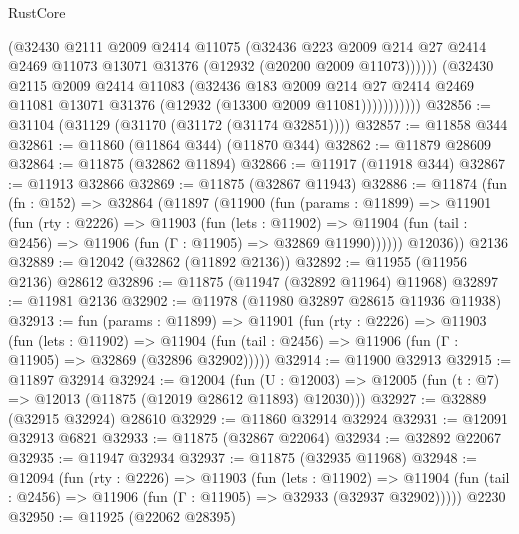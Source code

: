 \begin{lexlean}{RustCore}
\begin{coremodule}
                      (@32430
                        @2111
                        @2009
                        @2414
                        @11075
                        (@32436
                          @223
                          @2009
                          @214
                          @27
                          @2414
                          @2469
                          @11073
                          @13071
                          @31376
                          (@12932 (@20200 @2009 @11073))))))
                  (@32430
                    @2115
                    @2009
                    @2414
                    @11083
                    (@32436
                      @183
                      @2009
                      @214
                      @27
                      @2414
                      @2469
                      @11081
                      @13071
                      @31376
                      (@12932 (@13300 @2009 @11081)))))))))))
@32856 := @31104 (@31129 (@31170 (@31172 (@31174 @32851))))
@32857 := @11858 @344
@32861 := @11860 (@11864 @344) (@11870 @344)
@32862 := @11879 @28609
@32864 := @11875 (@32862 @11894)
@32866 := @11917 (@11918 @344)
@32867 := @11913 @32866
@32869 := @11875 (@32867 @11943)
@32886 := @11874
    (fun (fn : @152) =>
    @32864
      (@11897
        (@11900
          (fun (params : @11899) =>
          @11901
            (fun (rty : @2226) =>
            @11903
              (fun (lets : @11902) =>
              @11904 (fun (tail : @2456) => @11906 (fun (Γ : @11905) => @32869 @11990))))))
        @12036))
    @2136
@32889 := @12042 (@32862 (@11892 @2136))
@32892 := @11955 (@11956 @2136) @28612
@32896 := @11875 (@11947 (@32892 @11964) @11968)
@32897 := @11981 @2136
@32902 := @11978 (@11980 @32897 @28615 @11936 @11938)
@32913 := fun (params : @11899) =>
  @11901
    (fun (rty : @2226) =>
    @11903
      (fun (lets : @11902) =>
      @11904 (fun (tail : @2456) => @11906 (fun (Γ : @11905) => @32869 (@32896 @32902)))))
@32914 := @11900 @32913
@32915 := @11897 @32914
@32924 := @12004
    (fun (U : @12003) => @12005 (fun (t : @7) => @12013 (@11875 (@12019 @28612 @11893) @12030)))
@32927 := @32889 (@32915 @32924) @28610
@32929 := @11860 @32914 @32924
@32931 := @12091 @32913 @6821
@32933 := @11875 (@32867 @22064)
@32934 := @32892 @22067
@32935 := @11947 @32934
@32937 := @11875 (@32935 @11968)
@32948 := @12094
    (fun (rty : @2226) =>
    @11903
      (fun (lets : @11902) =>
      @11904 (fun (tail : @2456) => @11906 (fun (Γ : @11905) => @32933 (@32937 @32902)))))
    @2230
@32950 := @11925 (@22062 @28395)

\end{coremodule}
\end{lexlean}
